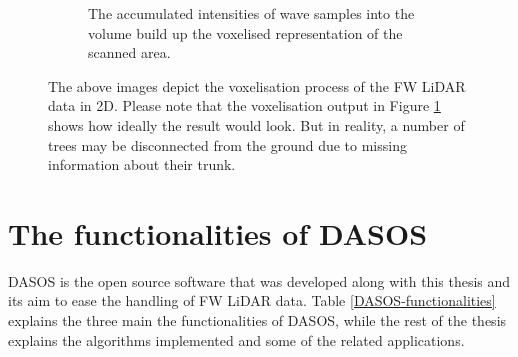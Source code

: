 \documentclass{subfiles}
\begin{document}
\begin{figure} [h!]
\begin{subfigure}[t]{.31\textwidth}
				\caption{The accumulated intensities of wave samples into the volume build up the voxelised representation of the scanned area.} 
				\label{fig:VoxelisationC_voxelised}
			\end{subfigure}
			\caption[Voxelisation of FW LiDAR data]{The above images depict the voxelisation process of the FW LiDAR data in 2D. Please note that the voxelisation output in Figure \ref{fig:VoxelisationC_voxelised} shows how ideally the result would look. But in reality, a number of trees may be disconnected from the ground due to missing information about their trunk.}
			\label{fig:Voxelisation}
		\end{figure}
		
		
	
		
		
	\section{The functionalities of DASOS}\label{DASOS}
	
	   	\par DASOS is the open source software that was developed along with this thesis and its aim to ease the handling of FW LiDAR data. Table \ref{DASOS-functionalities} explains the three main the functionalities of DASOS, while the rest of the thesis explains the algorithms implemented and some of the related applications.      
        	
     
        		
\end{document}
